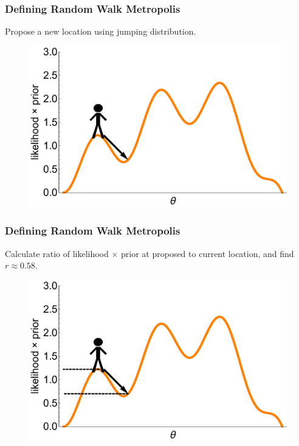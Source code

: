 \documentclass[handout]{beamer}
\begin{document}
\begin{frame}
\frametitle{Defining Random Walk Metropolis}
Propose a new location using jumping distribution.

\begin{figure}[ht]
\centerline{\includegraphics[width=1\textwidth]{./Figures/lec4_metropolisDefinition3.pdf}}
\end{figure}

\end{frame}

\begin{frame}
\frametitle{Defining Random Walk Metropolis}
Calculate ratio of likelihood $\times$ prior at proposed to current location, and find $r \approx 0.58$.

\begin{figure}[ht]
\centerline{\includegraphics[width=1\textwidth]{./Figures/lec4_metropolisDefinition4.pdf}}
\end{figure}

\end{frame}
\end{document}

